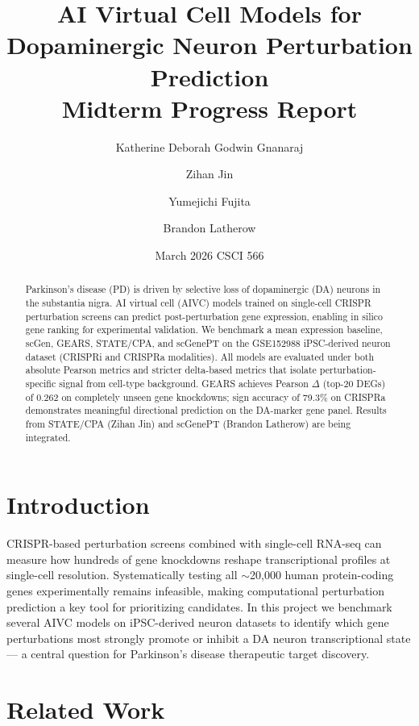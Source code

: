\documentclass[11pt,letterpaper]{article}
\title{\textbf{AI Virtual Cell Models for Dopaminergic Neuron Perturbation Prediction}\\
\large Midterm Progress Report}
\author{Katherine Deborah Godwin Gnanaraj \and Zihan Jin \and Yumejichi Fujita \and Brandon Latherow}
\date{March 2026 \quad CSCI 566}
\begin{document}
\maketitle

\begin{abstract}
Parkinson's disease (PD) is driven by selective loss of dopaminergic (DA) neurons in the
substantia nigra. AI virtual cell (AIVC) models trained on single-cell CRISPR perturbation
screens can predict post-perturbation gene expression, enabling in silico gene ranking for
experimental validation. We benchmark a mean expression baseline, scGen, GEARS, STATE/CPA,
and scGenePT on the GSE152988 iPSC-derived neuron dataset (CRISPRi and CRISPRa modalities).
All models are evaluated under both absolute Pearson metrics and stricter delta-based metrics
that isolate perturbation-specific signal from cell-type background. GEARS achieves Pearson
$\Delta$ (top-20 DEGs) of 0.262 on completely unseen gene knockdowns; sign accuracy of 79.3\%
on CRISPRa demonstrates meaningful directional prediction on the DA-marker gene panel. Results
from STATE/CPA (Zihan Jin) and scGenePT (Brandon Latherow) are being integrated.
\end{abstract}

\section{Introduction}

CRISPR-based perturbation screens combined with single-cell RNA-seq can measure how hundreds of
gene knockdowns reshape transcriptional profiles at single-cell resolution. Systematically
testing all $\sim$20,000 human protein-coding genes experimentally remains infeasible, making
computational perturbation prediction a key tool for prioritizing candidates. In this project we
benchmark several AIVC models on iPSC-derived neuron datasets to identify which gene
perturbations most strongly promote or inhibit a DA neuron transcriptional state --- a central
question for Parkinson's disease therapeutic target discovery.

\section{Related Work}
\end{document}
